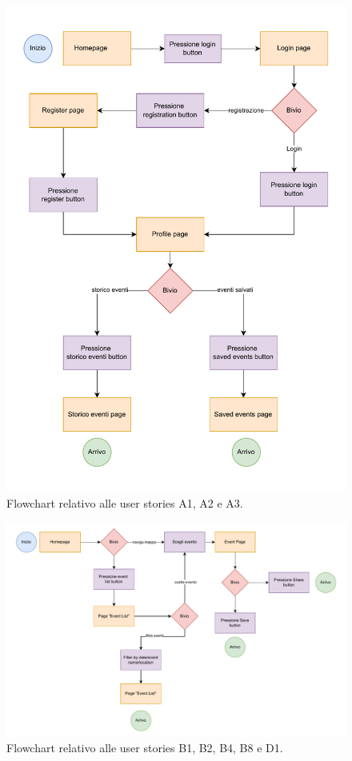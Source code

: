 \documentclass[9pt]{extarticle}
\begin{document}
\begin{figure}[!htb]
	\centering
	\includegraphics[width=0.7\linewidth]{./images/A1-A2-A3.pdf}
	\caption{Flowchart relativo alle user stories A1, A2 e A3.}
	\label{fig:A1-A2}
\end{figure}

\newpage 

\begin{figure}[!htb]
	\centering
	\includegraphics[width=\linewidth]{./images/B1-B2-B4-B8-D1.pdf}
	\caption{Flowchart relativo alle user stories B1, B2, B4, B8 e D1.}
	\label{fig:B1-C1}
\end{figure}
\end{document}
